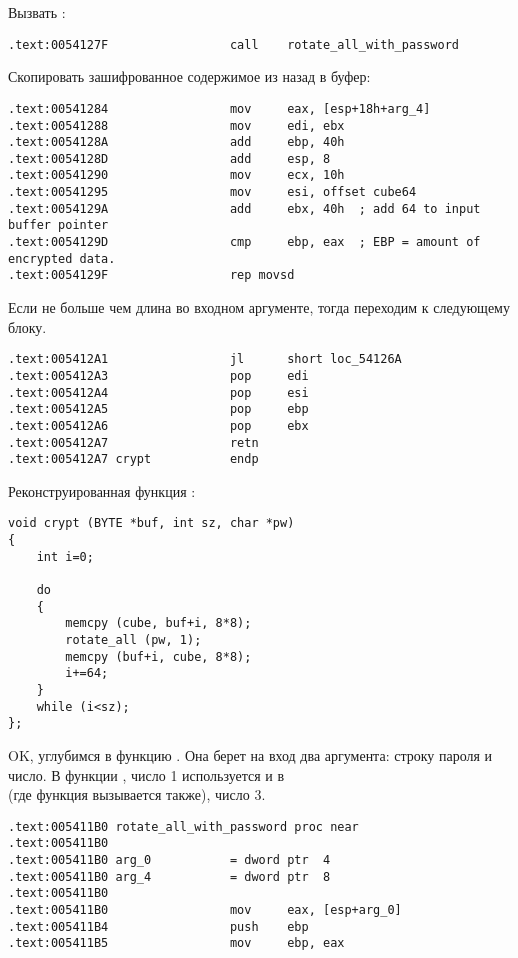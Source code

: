 Вызвать :

\begin{lstlisting}[style=customasm]
.text:0054127F                 call    rotate_all_with_password
\end{lstlisting}

Скопировать зашифрованное содержимое из  назад в буфер:

\begin{lstlisting}[style=customasm]
.text:00541284                 mov     eax, [esp+18h+arg_4]
.text:00541288                 mov     edi, ebx
.text:0054128A                 add     ebp, 40h
.text:0054128D                 add     esp, 8
.text:00541290                 mov     ecx, 10h
.text:00541295                 mov     esi, offset cube64
.text:0054129A                 add     ebx, 40h  ; add 64 to input buffer pointer
.text:0054129D                 cmp     ebp, eax  ; EBP = amount of encrypted data.
.text:0054129F                 rep movsd
\end{lstlisting}

Если \EBP не больше чем длина во входном аргументе, тогда переходим к следующему блоку.

\begin{lstlisting}[style=customasm]
.text:005412A1                 jl      short loc_54126A
.text:005412A3                 pop     edi
.text:005412A4                 pop     esi
.text:005412A5                 pop     ebp
.text:005412A6                 pop     ebx
.text:005412A7                 retn
.text:005412A7 crypt           endp
\end{lstlisting}

Реконструированная функция :

\begin{lstlisting}[style=customc]
void crypt (BYTE *buf, int sz, char *pw)
{
	int i=0;
	
	do
	{
		memcpy (cube, buf+i, 8*8);
		rotate_all (pw, 1);
		memcpy (buf+i, cube, 8*8);
		i+=64;
	}
	while (i<sz);
};
\end{lstlisting}

OK, углубимся в функцию . Она берет на вход два аргумента: 
строку пароля и число.
В функции , число 1 используется и в  \\
(где  функция вызывается также), число 3.

\begin{lstlisting}[style=customasm]
.text:005411B0 rotate_all_with_password proc near
.text:005411B0
.text:005411B0 arg_0           = dword ptr  4
.text:005411B0 arg_4           = dword ptr  8
.text:005411B0
.text:005411B0                 mov     eax, [esp+arg_0]
.text:005411B4                 push    ebp
.text:005411B5                 mov     ebp, eax
\end{lstlisting}

